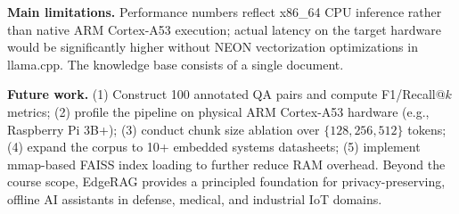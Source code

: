 \documentclass[10pt,twocolumn]{article}
\begin{document}
\textbf{Main limitations.} Performance numbers reflect x86\_64 CPU inference
rather than native ARM Cortex-A53 execution; actual latency on the target
hardware would be significantly higher without NEON vectorization
optimizations in llama.cpp. The knowledge base consists of a single document.

\textbf{Future work.} (1) Construct 100 annotated QA pairs and compute
F1/Recall@$k$ metrics; (2) profile the pipeline on physical ARM Cortex-A53
hardware (e.g., Raspberry Pi 3B+); (3) conduct chunk size ablation over
$\{128, 256, 512\}$ tokens; (4) expand the corpus to 10+ embedded systems
datasheets; (5) implement mmap-based FAISS index loading to further reduce
RAM overhead. Beyond the course scope, EdgeRAG provides a principled
foundation for privacy-preserving, offline AI assistants in defense, medical,
and industrial IoT domains.



\end{document}
